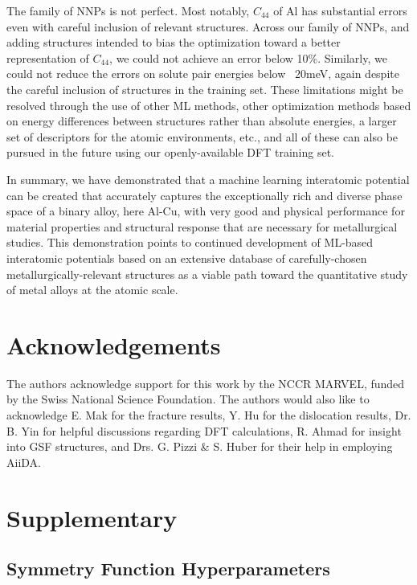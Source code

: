 \documentclass{article}
\begin{document}
The family of NNPs is not perfect.  Most notably, $C_{44}$ of Al has substantial errors even with careful inclusion of relevant structures.
Across our family of NNPs, and adding structures intended to bias the optimization toward a better representation of $C_{44}$, we could not achieve an error below 10\%.  Similarly, we could not reduce the errors on solute pair energies below ~20meV, again despite the careful inclusion of structures in the training set.  These limitations might be resolved through the use of other ML methods, other optimization methods based on energy differences between structures rather than absolute energies, a larger set of descriptors for the atomic environments, etc., and all of these can also be pursued in the future using our openly-available DFT training set.

In summary, we have demonstrated that a machine learning interatomic potential can be created that accurately captures the exceptionally rich and diverse phase space of a binary alloy, here Al-Cu, with very good and physical performance for material properties and structural response that are necessary for metallurgical studies.  This demonstration points to continued development of ML-based interatomic potentials based on an extensive database of carefully-chosen metallurgically-relevant structures as a viable path toward the quantitative study of metal alloys at the atomic scale.

\section{Acknowledgements}
The authors acknowledge support for this work by the NCCR MARVEL, funded by the Swiss National Science Foundation. The authors would also like to acknowledge E. Mak for the fracture results, Y. Hu for the dislocation results, Dr. B. Yin for helpful discussions regarding DFT calculations, R. Ahmad for insight into GSF structures, and Drs. G. Pizzi \& S. Huber for their help in employing AiiDA.

\newpage
  

\newpage
\appendix
\section{Supplementary}
\subsection{Symmetry Function Hyperparameters} \label{apd_sct:symmfunc_hyperparam}
\end{document}
